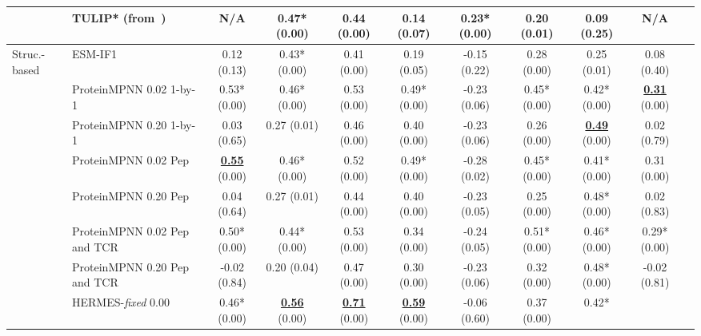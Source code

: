 \begin{table}[ht]
{\begin{tabular}{ l l c c c c c c c c c }
& TULIP* (from~\cite{Meynard-Piganeau2024-po}) & N/A & 0.47* \scriptsize{(0.00)} & 0.44
\scriptsize{(0.00)} & 0.14 \scriptsize{(0.07)} & 0.23* \scriptsize{(0.00)} & 0.20
\scriptsize{(0.01)} & 0.09 \scriptsize{(0.25)} & N/A \\
\hline
\multirow{9}{*}{Struc.-based} & ESM-IF1 & 0.12 \scriptsize{(0.13)} & 0.43* \scriptsize{(0.00)} &
0.41 \scriptsize{(0.00)} & 0.19 \scriptsize{(0.05)} & -0.15 \scriptsize{(0.22)} & 0.28
\scriptsize{(0.00)} & 0.25 \scriptsize{(0.01)} & 0.08 \scriptsize{(0.40)} \\
& ProteinMPNN 0.02 1-by-1 & 0.53* \scriptsize{(0.00)} & 0.46* \scriptsize{(0.00)} & 0.53
\scriptsize{(0.00)} & 0.49* \scriptsize{(0.00)} & -0.23 \scriptsize{(0.06)} & 0.45*
\scriptsize{(0.00)} & 0.42* \scriptsize{(0.00)} & {\bf \underline{0.31}} \scriptsize{(0.00)} \\
& ProteinMPNN 0.20 1-by-1 & 0.03 \scriptsize{(0.65)} & 0.27 \scriptsize{(0.01)} & 0.46
\scriptsize{(0.00)} & 0.40 \scriptsize{(0.00)} & -0.23 \scriptsize{(0.06)} & 0.26
\scriptsize{(0.00)} & {\bf \underline{0.49}} \scriptsize{(0.00)} & 0.02 \scriptsize{(0.79)} \\
& ProteinMPNN 0.02 Pep & {\bf\underline{0.55}} \scriptsize{(0.00)} & 0.46* \scriptsize{(0.00)} &
0.52 \scriptsize{(0.00)} & 0.49* \scriptsize{(0.00)} & -0.28 \scriptsize{(0.02)} & 0.45*
\scriptsize{(0.00)} & 0.41* \scriptsize{(0.00)} & 0.31 \scriptsize{(0.00)} \\
& ProteinMPNN 0.20 Pep & 0.04 \scriptsize{(0.64)} & 0.27 \scriptsize{(0.01)} & 0.44
\scriptsize{(0.00)} & 0.40 \scriptsize{(0.00)} & -0.23 \scriptsize{(0.05)} & 0.25
\scriptsize{(0.00)} & 0.48* \scriptsize{(0.00)} & 0.02 \scriptsize{(0.83)} \\
& ProteinMPNN 0.02 Pep and TCR & 0.50* \scriptsize{(0.00)} & 0.44* \scriptsize{(0.00)} & 0.53
\scriptsize{(0.00)} & 0.34 \scriptsize{(0.00)} & -0.24 \scriptsize{(0.05)} & 0.51*
\scriptsize{(0.00)} & 0.46* \scriptsize{(0.00)} & 0.29* \scriptsize{(0.00)} \\
& ProteinMPNN 0.20 Pep and TCR & -0.02 \scriptsize{(0.84)} & 0.20 \scriptsize{(0.04)} & 0.47
\scriptsize{(0.00)} & 0.30 \scriptsize{(0.00)} & -0.23 \scriptsize{(0.06)} & 0.32
\scriptsize{(0.00)} & 0.48* \scriptsize{(0.00)} & -0.02 \scriptsize{(0.81)} \\
\hline
\multirow{6}{*}{Struc.-based }& HERMES-{\em fixed} 0.00 & 0.46* \scriptsize{(0.00)} & {\bf
\underline{0.56}} \scriptsize{(0.00)} & {\bf \underline{0.71}} \scriptsize{(0.00)} & {\bf
\underline{0.59}} \scriptsize{(0.00)} & -0.06 \scriptsize{(0.60)} & 0.37 \scriptsize{(0.00)} & 0.42*

\end{tabular}}
\end{table}
